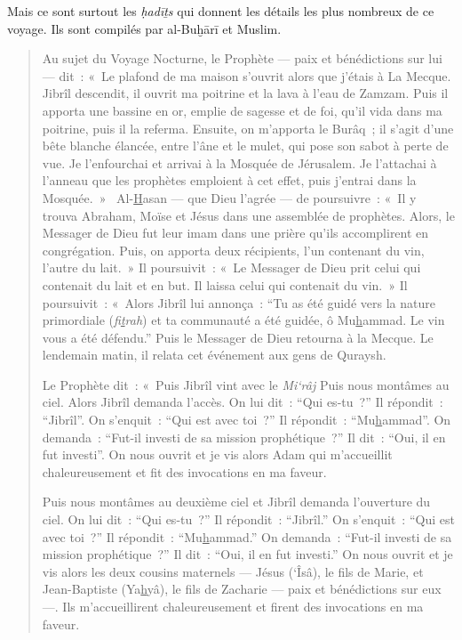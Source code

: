 Mais ce sont surtout les \emph{ḥadīṯs} qui donnent les détails les plus
nombreux de ce voyage. Ils sont compilés par al-Buḫārī et
Muslim.

\begin{quote}
Au sujet du Voyage Nocturne, le Prophète --- paix et bénédictions sur
lui --- dit~: «~Le plafond de ma maison s'ouvrit alors que j'étais à La
Mecque. Jibrîl descendit, il ouvrit ma poitrine et la lava à l'eau de
Zamzam. Puis il apporta une bassine en or, emplie de sagesse et de foi,
qu'il vida dans ma poitrine, puis il la referma. Ensuite, on m'apporta
le Burâq~; il s'agit d'une bête blanche élancée, entre l'âne et le
mulet, qui pose son sabot à perte de vue. Je l'enfourchai et arrivai à
la Mosquée de Jérusalem. Je l'attachai à l'anneau que les prophètes
emploient à cet effet, puis j'entrai dans la Mosquée.~»~
Al-\underline{H}asan --- que Dieu l'agrée --- de poursuivre~: «~Il y
trouva Abraham, Moïse et Jésus dans une assemblée de prophètes. Alors,
le Messager de Dieu fut leur imam dans une prière qu'ils accomplirent en
congrégation. Puis, on apporta deux récipients, l'un contenant du vin,
l'autre du lait.~» Il poursuivit~: «~Le Messager de Dieu prit celui qui
contenait du lait et en but. Il laissa celui qui contenait du vin.~» Il
poursuivit~: «~Alors Jibrîl lui annonça~: ``Tu as été guidé vers la
nature primordiale (\emph{fi\underline{t}rah}) et ta communauté a été
guidée, ô Mu\underline{h}ammad. Le vin vous a été défendu.'' Puis le
Messager de Dieu retourna à la Mecque. Le lendemain matin, il relata cet
événement aux gens de Quraysh.

Le Prophète dit~: «~Puis Jibrîl vint avec le \emph{Mi`râj} Puis nous
montâmes au ciel. Alors Jibrîl demanda l'accès. On lui dit~: ``Qui
es-tu~?'' Il répondit~: ``Jibrîl''. On s'enquit~: ``Qui est avec toi~?''
Il répondit~: ``Mu\underline{h}ammad''. On demanda~: ``Fut-il investi de
sa mission prophétique~?'' Il dit~: ``Oui, il en fut investi''. On nous
ouvrit et je vis alors Adam qui m'accueillit chaleureusement et fit des
invocations en ma faveur.

Puis nous montâmes au deuxième ciel et Jibrîl demanda l'ouverture du
ciel. On lui dit~: ``Qui es-tu~?'' Il répondit~: ``Jibrîl.'' On
s'enquit~: ``Qui est avec toi~?'' Il répondit~:
``Mu\underline{h}ammad.'' On demanda~: ``Fut-il investi de sa mission
prophétique~?'' Il dit~: ``Oui, il en fut investi.'' On nous ouvrit et
je vis alors les deux cousins maternels --- Jésus (`Îsâ), le fils de
Marie, et Jean-Baptiste (Ya\underline{h}yâ), le fils de Zacharie ---
paix et bénédictions sur eux ---. Ils m'accueillirent chaleureusement et
firent des invocations en ma faveur.


\end{quote}
